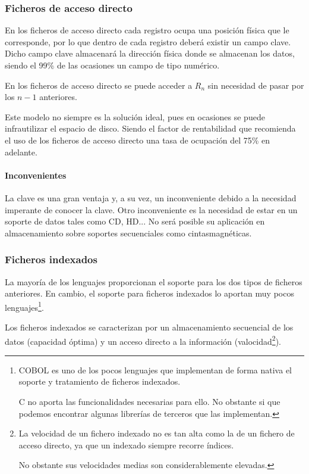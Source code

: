 \documentclass[a4paper, 11pt, titlepage]{article}
\begin{document}
        \subsubsection{Ficheros de acceso directo}

            En los ficheros de acceso directo cada registro ocupa una posición física que le corresponde, 
            por lo que dentro de cada registro deberá existir un campo clave.
            Dicho campo clave almacenará la dirección física donde se almacenan los datos, siendo el 
            99\% de las ocasiones un campo de tipo numérico.

            En los ficheros de acceso directo se puede acceder a $R_n$ sin necesidad de pasar por los 
            $n-1$ anteriores.

            Este modelo no siempre es la solución ideal, pues en ocasiones se puede infrautilizar el espacio
            de disco. Siendo el factor de rentabilidad que recomienda el uso de los ficheros de acceso directo 
            una tasa de ocupación del 75\% en adelante.

            \paragraph{Inconvenientes} La clave es una gran ventaja y, a su vez, un inconveniente debido a la 
            necesidad imperante de conocer la clave. Otro inconveniente es la necesidad de estar en un soporte 
            de datos tales como CD, HD... No será posible su aplicación en almacenamiento sobre soportes 
            secuenciales como cintasmagnéticas.

        \subsubsection{Ficheros indexados}

            La mayoría de los lenguajes proporcionan el soporte para los dos tipos de ficheros anteriores.
            En cambio, el soporte para ficheros indexados lo aportan muy pocos lenguajes\footnote{
                COBOL es uno de los pocos lenguajes que implementan de forma nativa el soporte y tratamiento 
                de ficheros indexados.

                C no aporta las funcionalidades necesarias para ello. No obstante si que podemos encontrar
                algunas librerías de terceros que las implementan.
            }.

            Los ficheros indexados se caracterizan por un almacenamiento secuencial de los datos (capacidad 
            óptima) y un acceso directo a la información (valocidad\footnote{
                La velocidad de un fichero indexado no es tan alta como la de un fichero de acceso directo, ya 
                que un indexado siempre recorre índices. 

                No obstante sus velocidades medias son considerablemente elevadas.
            }).
\end{document}
